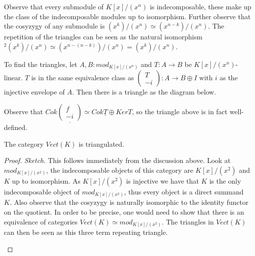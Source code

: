     Observe that every submodule of $K[x]/(x^n)$ is indecomposable, these make up the class of the indecomposable modules up to isomorphism. Further observe that the cosyzygy of any submodule is \upside{$\Omega$}$(x^k)/(x^n)\simeq (x^{n-k})/(x^n)$. The repetition of the triangles can be seen as the natural isomorphism \upside{$\Omega$}$^2(x^k)/(x^n)\simeq (x^{n-(n-k)})/(x^n) = (x^k)/(x^n)$.

    To find the triangles, let $A,B:mod_{K[x]/(x^n)}$ and $T:A\rightarrow B$ be $K[x]/(x^n)$-linear. $T$ is in the same equivalence class as $\begin{pmatrix} T \\ -i \end{pmatrix}:A\rightarrow B\oplus I$ with $i$ as the injective envelope of $A$. Then there is a triangle as the diagram below.

    \begin{center}
    \end{center}

    Observe that $Cok\underline{\begin{pmatrix} f \\ -i \end{pmatrix}} \simeq Cok\underline{T}\oplus Ker$\underline{\upside{$\Omega$}$T$}, so the triangle above is in fact well-defined.

    \begin{lemma}
        The category $Vect(K)$ is triangulated.
    \end{lemma}

    \begin{proof}\emph{Sketch.} This follows immediately from the discussion above. Look at $mod_{K[x]/(x^2)}$, the indecomposable objects of this category are $K[x]/(x^2)$ and $K$ up to isomorphism. As $K[x]/(x^2)$ is injective we have that $K$ is the only indecomposable object of \underline{$mod_{K[x]/(x^2)}$}, thus every object is a direct summand $K$. Also observe that the cosyzygy is naturally isomorphic to the identity functor on the quotient. In order to be precise, one would need to show that there is an equivalence of categories $Vect(K)\simeq mod_{K[x]/(x^2)}$. The triangles in $Vect(K)$ can then be seen as this three term repeating triangle.
        \begin{center}
        \end{center}
    \end{proof}

